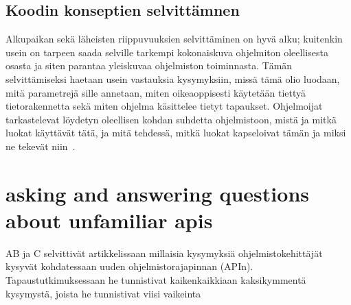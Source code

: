 \documentclass[finnish]{../tktltiki2}
\theoremstyle{definition}
\theoremstyle{remark}
\begin{document}
\subsection{Koodin konseptien selvittämnen}
Alkupaikan sekä läheisten riippuvuuksien selvittäminen on hyvä alku; kuitenkin usein on tarpeen saada selville tarkempi kokonaiskuva ohjelmiton oleellisesta osasta ja siten parantaa yleiskuvaa ohjelmiston toiminnasta. Tämän selvittämiseksi haetaan usein vastauksia kysymyksiin, missä tämä olio luodaan, mitä parametrejä sille annetaan, miten oikeaoppisesti käytetään tiettyä tietorakennetta sekä miten ohjelma käsittelee tietyt tapaukset. Ohjelmoijat tarkastelevat löydetyn oleellisen kohdan suhdetta ohjelmistoon, mistä ja mitkä luokat käyttävät tätä, ja mitä tehdessä, mitkä luokat kapseloivat tämän ja miksi ne tekevät niin~\cite{questions-during-software-evolution-tasks}.

\section{asking and answering questions about unfamiliar apis}
AB ja C selvittivät artikkelissaan \cite{asking-and-answering-api-questions} millaisia kysymyksiä ohjelmistokehittäjät kysyvät kohdatessaan uuden ohjelmistorajapinnan (APIn).
Tapaustutkimuksessaan he tunnistivat kaikenkaikkiaan kaksikymmentä kysymystä, joista he tunnistivat viisi vaikeinta
\end{document}
